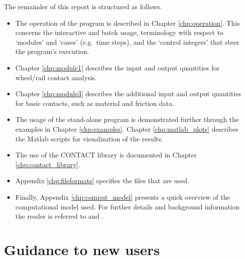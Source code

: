 \documentclass[12pt]{report}
\renewcommand{\magenta}[1]{}
\begin{document}
The remainder of this report is structured as follows.
\begin{itemize}
\item The operation of the program is described in Chapter
        \ref{chp:operation}. This concerns the interactive and batch usage,
        terminology with respect to `modules' and `cases' (e.g.\ time steps),
        and the `control integers' that steer the program's execution.
\item Chapter \ref{chp:module1} describes the input and output quantities
        for wheel/rail contact analysis.
\item Chapter \ref{chp:module3} describes the additional input and output
        quantities for basic contacts, such as material and friction data.
\item The usage of the stand-alone program is demonstrated further
        through the examples in Chapter \ref{chp:examples}. Chapter
        \ref{chp:matlab_plots} describes the Matlab scripts for
        visualization of the results.
\item The use of the CONTACT library is documented in Chapter
        \ref{chp:contact_library}.
\item Appendix \ref{chp:fileformats} specifies the files that are used.
\item Finally, Appendix \ref{chp:comput_model} presents a quick overview of
        the computational model used. For further details and background
        information the reader is referred to \cite{Kalker1990,Kalker2000,
        Vollebregt2020c-distr-force,Vollebregt2021a-soa-paper} and
        \cite{Vollebregt2011a-assessm}.
\end{itemize}

\magenta{
\paragraph{Experimental features}
The program has a number of `hidden' features, available only in the
development version. These are considered experimental and may be changed
or deleted in future versions. Such features are marked magenta in this
user guide.}

\section{Guidance to new users}
\end{document}
